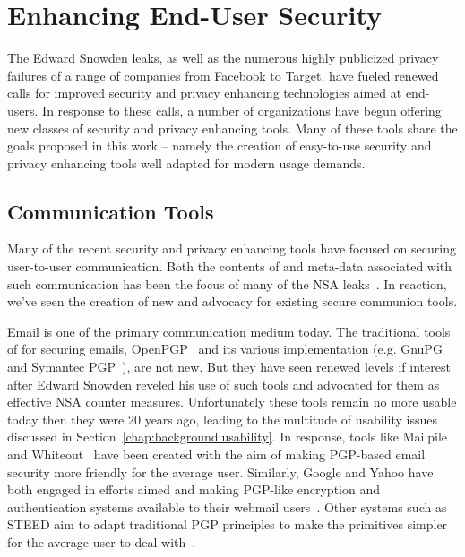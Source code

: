 \section{Enhancing End-User Security}
\label{chap:related:enduser}

The Edward Snowden leaks, as well as the numerous highly publicized
privacy failures of a range of companies from Facebook to Target, have
fueled renewed calls for improved security and privacy enhancing
technologies aimed at end-users. In response to these calls, a number
of organizations have begun offering new classes of security and privacy
enhancing tools. Many of these tools share the goals proposed in this
work -- namely the creation of easy-to-use security and privacy enhancing
tools well adapted for modern usage demands.

\subsection{Communication Tools}

Many of the recent security and privacy enhancing tools have focused
on securing user-to-user communication. Both the contents of and
meta-data associated with such communication has been the focus of
many of the NSA leaks~\cite{schneier-metadata}. In reaction, we've
seen the creation of new and advocacy for existing secure communion
tools.

Email is one of the primary communication medium today. The
traditional tools of for securing emails, OpenPGP~\cite{openpgp} and
its various implementation (e.g. GnuPG~\cite{gnupg} and Symantec
PGP~\cite{pgp}), are not new. But they have seen renewed levels if
interest after Edward Snowden reveled his use of such tools and
advocated for them as effective NSA counter measures. Unfortunately
these tools remain no more usable today then they were 20 years ago,
leading to the multitude of usability issues discussed in
Section~\ref{chap:background:usability}. In response, tools like
Mailpile~\cite{mailpile} and Whiteout~\cite{whiteout} have been
created with the aim of making PGP-based email security more friendly
for the average user. Similarly, Google and Yahoo have both engaged in
efforts aimed and making PGP-like encryption and authentication
systems available to their webmail users~\cite{google-endtoend,
  yahoo-endtoend}. Other systems such as STEED aim to adapt
traditional PGP principles to make the primitives simpler for the
average user to deal with~\cite{koch2011}.

